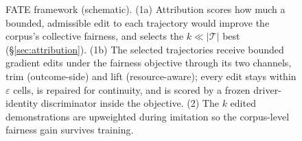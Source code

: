 \begin{figure}[t]
  \centering
  
  \caption{FATE framework (schematic). (1a) Attribution scores how much a
  bounded, admissible edit to each trajectory would improve the corpus's
  collective fairness, and selects the $k \ll |\mathcal{T}|$ best
  (\S\ref{sec:attribution}). (1b) The selected trajectories receive bounded
  gradient edits under the fairness objective through its two channels, trim
  (outcome-side) and lift (resource-aware); every edit stays within
  $\varepsilon$ cells, is repaired for
  continuity, and is scored by a frozen driver-identity discriminator inside
  the objective. (2) The $k$ edited demonstrations are upweighted during
  imitation so the corpus-level fairness gain survives training.}
\end{figure}
